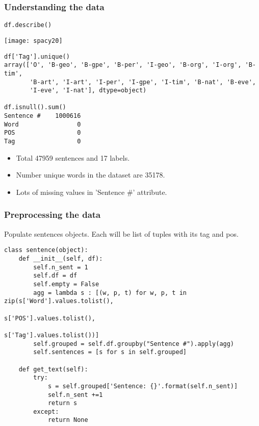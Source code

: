 \begin{frame}[fragile]\frametitle{Understanding the data}


\begin{lstlisting}
df.describe()
\end{lstlisting}

\begin{center}
\texttt{[image: spacy20]}
\end{center}

\begin{lstlisting}
df['Tag'].unique()
array(['O', 'B-geo', 'B-gpe', 'B-per', 'I-geo', 'B-org', 'I-org', 'B-tim',
       'B-art', 'I-art', 'I-per', 'I-gpe', 'I-tim', 'B-nat', 'B-eve',
       'I-eve', 'I-nat'], dtype=object)
			 
df.isnull().sum()
Sentence #    1000616
Word                0
POS                 0
Tag                 0
\end{lstlisting}

  \begin{itemize}
  \item Total 47959 sentences and 17 labels.
  \item Number unique words in the dataset are 35178.
	\item Lots of missing values in 'Sentence \#' attribute.
  \end{itemize}
\end{frame}

\begin{frame}[fragile]\frametitle{Preprocessing the data}

Populate sentences objects. Each will be list of tuples with its tag and pos.

\begin{lstlisting}
class sentence(object):
    def __init__(self, df):
        self.n_sent = 1
        self.df = df
        self.empty = False
        agg = lambda s : [(w, p, t) for w, p, t in zip(s['Word'].values.tolist(),
                                                       s['POS'].values.tolist(),
                                                       s['Tag'].values.tolist())]
        self.grouped = self.df.groupby("Sentence #").apply(agg)
        self.sentences = [s for s in self.grouped]
        
    def get_text(self):
        try:
            s = self.grouped['Sentence: {}'.format(self.n_sent)]
            self.n_sent +=1
            return s
        except:
            return None
\end{lstlisting}
\end{frame}

